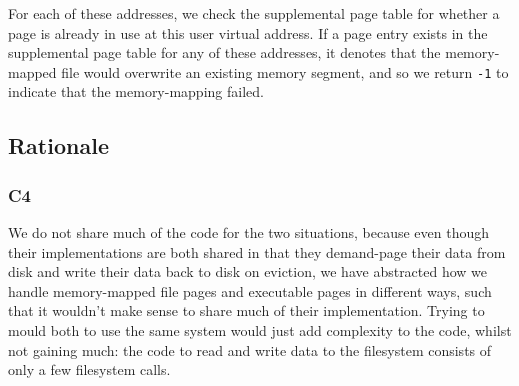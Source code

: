 \documentclass[a4wide, 11pt]{article}
\newcommand{\tx}{\texttt}
\begin{document}
For each of these addresses, we check the supplemental page table for whether a page is already in use at this user virtual address. If a page entry exists in the supplemental page table for any of these addresses, it denotes that the memory-mapped file would overwrite an existing memory segment, and so we return \tx{-1} to indicate that the memory-mapping failed.

\subsection{Rationale}
\subsubsection{C4}

We do not share much of the code for the two situations, because even though their implementations are both shared in that they demand-page their data from disk and write their data back to disk on eviction, we have abstracted how we handle memory-mapped file pages and executable pages in different ways, such that it wouldn't make sense to share much of their implementation. Trying to mould both to use the same system would just add complexity to the code, whilst not gaining much: the code to read and write data to the filesystem consists of only a few filesystem calls.
\end{document}
